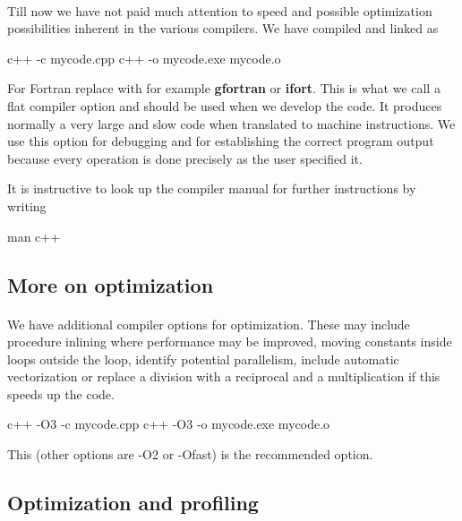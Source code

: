 \documentclass[%
oneside,                 %
final,                   %
10pt]{article}
\begin{document}
\paragraph{}

Till now we have not paid much attention to speed and possible optimization possibilities
inherent in the various compilers. We have compiled and linked as



\bcppcod
c++  -c  mycode.cpp
c++  -o  mycode.exe  mycode.o

\ecppcod

For Fortran replace with for example \textbf{gfortran} or \textbf{ifort}.
This is what we call a flat compiler option and should be used when we develop the code.
It produces normally a very large and slow code when translated to machine instructions.
We use this option for debugging and for establishing the correct program output because
every operation is done precisely as the user specified it.

It is instructive to look up the compiler manual for further instructions by writing


\bcppcod
man c++

\ecppcod


\subsection{More on optimization}

\paragraph{}
We have additional compiler options for optimization. These may include procedure inlining where 
performance may be improved, moving constants inside loops outside the loop, 
identify potential parallelism, include automatic vectorization or replace a division with a reciprocal
and a multiplication if this speeds up the code.



\bcppcod
c++  -O3 -c  mycode.cpp
c++  -O3 -o  mycode.exe  mycode.o

\ecppcod

This (other options are -O2 or -Ofast) is the recommended option.


\subsection{Optimization and profiling}
\end{document}
